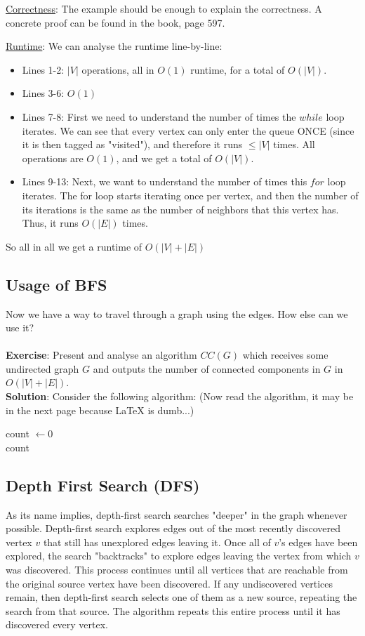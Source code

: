 \underline{Correctness}: The example should be enough to explain the correctness. A concrete proof can be found in the book, page 597.

\underline{Runtime}: We can analyse the runtime line-by-line:
\begin{itemize}
\item Lines 1-2: $|V|$ operations, all in $O(1)$ runtime, for a total of $O(|V|)$.
\item Lines 3-6: $O(1)$
\item Lines 7-8: First we need to understand the number of times the $while$ loop iterates. We can see that every vertex can only enter the queue ONCE (since it is then tagged as "visited"), and therefore it runs $\leq |V|$ times. All operations are $O(1)$, and we get a total of $O(|V|)$. 
\item Lines 9-13: Next, we want to understand the number of times this $for$ loop iterates. 
The for loop starts iterating once per vertex, and then the number of its iterations is the same as the number of neighbors that this vertex has. Thus, it runs $O(|E|)$ times.
\end{itemize}
So all in all we get a runtime of $O(|V|+|E|)$

\subsection{Usage of BFS}
Now we have a way to travel through a graph using the edges. How else can we use it?\\ \\ 
\textbf{Exercise}: Present and analyse an algorithm $CC(G)$ which receives some undirected graph $G$ and outputs the number of connected components in $G$ in $O(|V|+|E|)$. \\

\textbf{Solution}: Consider the following algorithm: (Now read the algorithm, it may be in the next page because LaTeX is dumb...)

  \begin{algorithm}[H]
     count $\leftarrow 0$\\
	\Return count
  \end{algorithm}


\subsection{Depth First Search (DFS)}
As its name implies, depth-first search searches "deeper" in the graph whenever possible. Depth-first search explores edges out of the most recently discovered vertex $v$ that still has unexplored edges leaving it. Once all of $ v$'s edges have been explored, the search "backtracks" to explore edges leaving the vertex from which $v$ was discovered. This process continues until all vertices that are reachable from the original source vertex have been discovered. If any undiscovered vertices remain, then depth-first search selects one of them as a new source, repeating the search from that source. The algorithm repeats this entire process until it has discovered every vertex.


